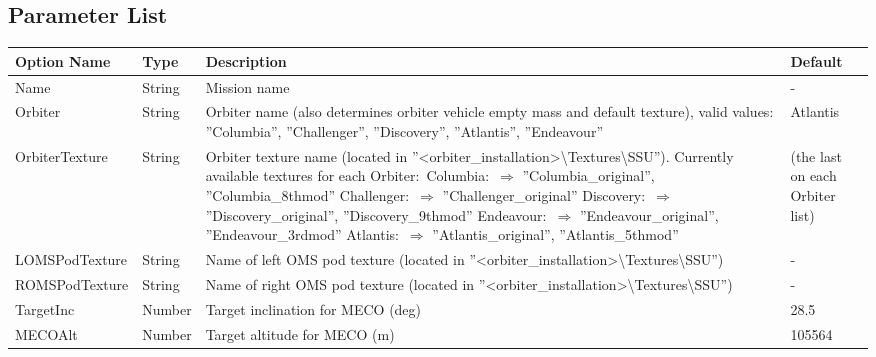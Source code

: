 \documentclass[Space_Shuttle_Ultra_Manual.tex]{subfiles}
\begin{document}
\subsection{Parameter List}
  \begin{longtable}{|l|p{1.5cm}|p{7.5cm}|p{2.0cm}|}
	\hline
	\rule{0pt}{2ex}
	\textbf{Option Name} & \textbf{Type} & \textbf{Description} & \textbf{Default}\\
	\hline
	\rule{0pt}{2ex}
	Name & String & Mission name & -\\
	\hline
	\rule{0pt}{2ex}
	Orbiter & String & Orbiter name (also determines orbiter vehicle empty mass and default texture), valid values$\colon$ ''Columbia'', ''Challenger'', ''Discovery'', ''Atlantis'', ''Endeavour'' & Atlantis\\
	\hline
	\rule{0pt}{2ex}
	OrbiterTexture & String & Orbiter texture name (located in ''<orbiter\_installation>\textbackslash Textures\textbackslash SSU''). Currently available textures for each Orbiter$\colon$ \newline
Columbia$\colon$ \newline
$\Rightarrow$ ''Columbia\_original'', ''Columbia\_8thmod''\newline
Challenger$\colon$\newline
$\Rightarrow$ ''Challenger\_original''\newline
Discovery$\colon$\newline
$\Rightarrow$ ''Discovery\_original'', ''Discovery\_9thmod''\newline
Endeavour$\colon$\newline
$\Rightarrow$ ''Endeavour\_original'', ''Endeavour\_3rdmod''\newline
Atlantis$\colon$\newline
$\Rightarrow$ ''Atlantis\_original'', ''Atlantis\_5thmod''	& (the last on each Orbiter list)\\
	\hline
	\rule{0pt}{2ex}
	LOMSPodTexture & String & Name of left OMS pod texture (located in ''<orbiter\_installation>\textbackslash Textures\textbackslash SSU'') & -\\
	\hline
	\rule{0pt}{2ex}
	ROMSPodTexture & String & Name of right OMS pod texture (located in ''<orbiter\_installation>\textbackslash Textures\textbackslash SSU'') & -\\
	\hline
	\rule{0pt}{2ex}
	TargetInc & Number & Target inclination for MECO (deg) & 28.5\\
	\hline
	\rule{0pt}{2ex}
	MECOAlt & Number & Target altitude for MECO (m) & 105564\\

\end{longtable}
\end{document}
